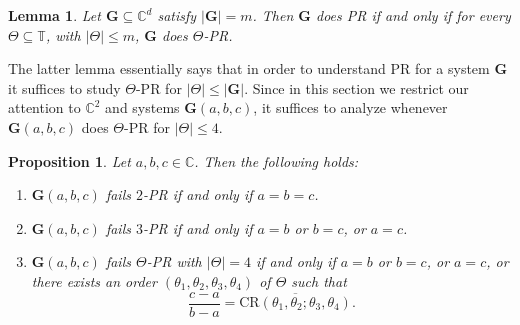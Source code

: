 \documentclass[reqno,a4paper,11pt]{amsart}
\numberwithin{equation}{section}
\newtheorem{lemma}[definition]{Lemma}
\newtheorem{proposition}[definition]{Proposition}
\def\T{{\mathbb T}}
\def\C{{\mathbb C}}
\newcommand\1{\mathds{1}}
\begin{document}
\begin{lemma}\label{lma:m_PR_is_PR}
    Let $\mathbf{G}\subseteq \C^d$ satisfy $|\mathbf{G}|=m$. Then $\mathbf{G}$ does PR if and only if for every $\Theta\subseteq \T$, with $|\Theta|\leq m$, $\mathbf{G}$ does $\Theta$-PR.
\end{lemma}

The latter lemma essentially says that in order to understand PR for a system $\mathbf{G}$ it suffices to study $\Theta$-PR for $|\Theta|\leq |\mathbf{G}|$. Since in this section we restrict our attention to $\C^2$ and systems $\mathbf{G}(a,b,c)$, it suffices to analyze whenever $\mathbf{G}(a,b,c)$ does $\Theta$-PR for $|\Theta|\leq 4$.

\begin{proposition}\label{prop:C2framesCharacterization}
    Let $a,b,c \in \C$. Then the following holds:
    \begin{enumerate}
        \item $\mathbf{G}(a,b,c)$ fails $2$-PR if and only if $a=b=c$.
        \item $\mathbf{G}(a,b,c)$ fails $3$-PR if and only if $a=b$ or $b=c$, or $a=c$.
        \item $\mathbf{G}(a,b,c)$ fails $\Theta$-PR with $|\Theta|=4$ if and only if $a=b$ or $b=c$, or $a=c$, or there exists an order $(\theta_1, \theta_2,\theta_3, \theta_4)$ of $\Theta$ such that
        $$\frac{c-a}{b-a} = \overline{\mathrm{CR}(\theta_1,\theta_2;\theta_3,\theta_4)}.
        $$
    \end{enumerate}
\end{proposition}
\end{document}
